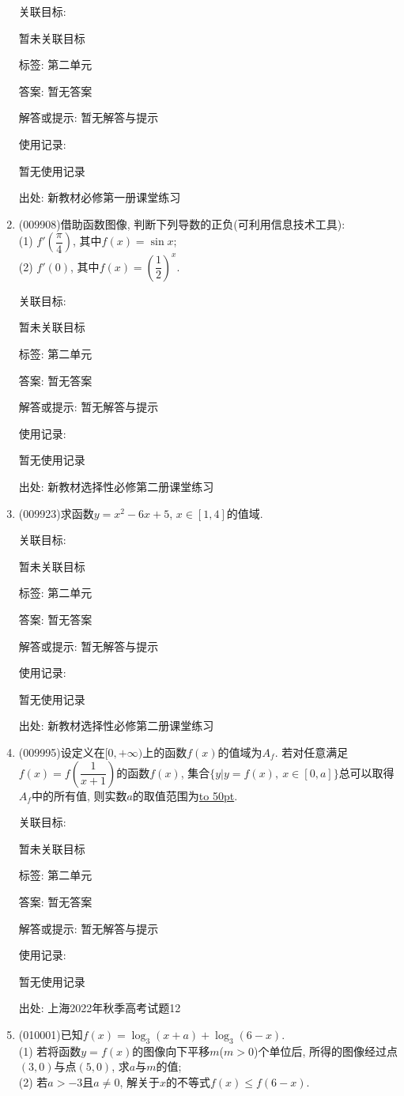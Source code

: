 \documentclass[10pt,a4paper]{article}
\newcommand{\blank}[1]{\underline{\hbox to #1pt{}}}
\begin{document}
\begin{enumerate}[1.]
关联目标:

暂未关联目标



标签: 第二单元

答案: 暂无答案

解答或提示: 暂无解答与提示

使用记录:

暂无使用记录


出处: 新教材必修第一册课堂练习
\item { (009908)}借助函数图像, 判断下列导数的正负(可利用信息技术工具):\\
(1) $f'(\dfrac\pi 4)$, 其中$f(x)=\sin x$;\\
(2) $f'(0)$, 其中$f(x)=(\dfrac 12)^x$.


关联目标:

暂未关联目标



标签: 第二单元

答案: 暂无答案

解答或提示: 暂无解答与提示

使用记录:

暂无使用记录


出处: 新教材选择性必修第二册课堂练习
\item { (009923)}求函数$y=x^2-6x+5$, $x\in [1, 4]$的值域.


关联目标:

暂未关联目标



标签: 第二单元

答案: 暂无答案

解答或提示: 暂无解答与提示

使用记录:

暂无使用记录


出处: 新教材选择性必修第二册课堂练习
\item { (009995)}设定义在$[0,+\infty)$上的函数$f(x)$的值域为$A_f$. 若对任意满足$f(x)=f(\dfrac 1{x+1})$的函数$f(x)$, 集合$\{y|y=f(x), \ x\in [0,a]\}$总可以取得$A_f$中的所有值, 则实数$a$的取值范围为\blank{50}.


关联目标:

暂未关联目标



标签: 第二单元

答案: 暂无答案

解答或提示: 暂无解答与提示

使用记录:

暂无使用记录


出处: 上海2022年秋季高考试题12
\item { (010001)}已知$f(x)=\log_3(x+a)+\log_3(6-x)$.\\
(1) 若将函数$y=f(x)$的图像向下平移$m$($m>0$)个单位后, 所得的图像经过点$(3,0)$与点$(5,0)$, 求$a$与$m$的值;\\
(2) 若$a>-3$且$a\ne 0$, 解关于$x$的不等式$f(x)\le f(6-x)$.



\end{enumerate}
\end{document}
